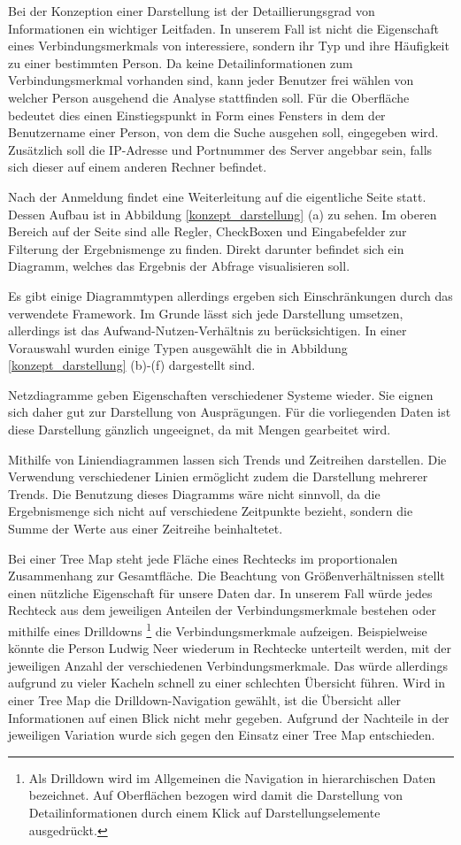 Bei der Konzeption einer Darstellung ist der Detaillierungsgrad von Informationen ein wichtiger Leitfaden. In unserem Fall ist nicht die Eigenschaft eines Verbindungsmerkmals von interessiere, sondern ihr Typ und ihre Häufigkeit zu einer bestimmten Person. Da keine Detailinformationen zum Verbindungsmerkmal vorhanden sind, kann jeder Benutzer frei wählen von welcher Person ausgehend die Analyse stattfinden soll. Für die Oberfläche bedeutet dies einen Einstiegspunkt in Form eines Fensters in dem der Benutzername einer Person, von dem die Suche ausgehen soll, eingegeben wird. Zusätzlich soll die IP-Adresse und Portnummer des Server angebbar sein, falls sich dieser auf einem anderen Rechner befindet.

Nach der Anmeldung findet eine Weiterleitung auf die eigentliche Seite statt. Dessen Aufbau ist in Abbildung \ref{konzept_darstellung} (a) zu sehen. Im oberen Bereich auf der Seite sind alle Regler, CheckBoxen und Eingabefelder zur Filterung der Ergebnismenge zu finden. Direkt darunter befindet sich ein Diagramm, welches das Ergebnis der Abfrage visualisieren soll.

Es gibt einige Diagrammtypen allerdings ergeben sich Einschränkungen durch das verwendete Framework. Im Grunde lässt sich jede Darstellung umsetzen, allerdings ist das Aufwand-Nutzen-Verhältnis zu berücksichtigen. In einer Vorauswahl wurden einige  Typen ausgewählt die in Abbildung \ref{konzept_darstellung} (b)-(f) dargestellt sind. 

Netzdiagramme geben Eigenschaften verschiedener Systeme wieder. Sie eignen sich daher gut zur Darstellung von Ausprägungen. Für die vorliegenden Daten ist diese Darstellung gänzlich ungeeignet, da mit Mengen gearbeitet wird. 

Mithilfe von Liniendiagrammen lassen sich Trends und Zeitreihen darstellen. Die Verwendung verschiedener Linien ermöglicht zudem die Darstellung mehrerer Trends. Die Benutzung dieses Diagramms wäre nicht sinnvoll, da die Ergebnismenge sich nicht auf verschiedene Zeitpunkte bezieht, sondern die Summe der Werte aus einer Zeitreihe beinhaltetet. 

Bei einer Tree Map steht jede Fläche eines Rechtecks im proportionalen Zusammenhang zur Gesamtfläche. Die Beachtung von Größenverhältnissen stellt einen nützliche Eigenschaft für unsere Daten dar. In unserem Fall würde jedes Rechteck aus dem jeweiligen Anteilen der Verbindungsmerkmale bestehen oder mithilfe eines Drilldowns
\footnote{Als Drilldown wird im Allgemeinen die Navigation in hierarchischen Daten bezeichnet. Auf Oberflächen bezogen wird damit die Darstellung von Detailinformationen durch einem Klick auf Darstellungselemente ausgedrückt.}
 die Verbindungsmerkmale aufzeigen. Beispielweise könnte die Person Ludwig Neer wiederum in Rechtecke unterteilt werden, mit der jeweiligen Anzahl der verschiedenen Verbindungsmerkmale. Das würde allerdings aufgrund zu vieler Kacheln schnell zu einer schlechten Übersicht führen. Wird in einer Tree Map die Drilldown-Navigation gewählt, ist die Übersicht aller Informationen auf einen Blick nicht mehr gegeben. Aufgrund der Nachteile in der jeweiligen Variation wurde sich gegen den Einsatz einer Tree Map entschieden.

